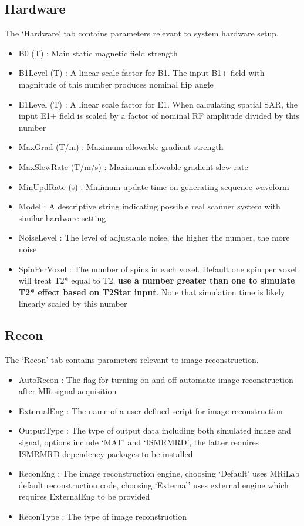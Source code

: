 \documentclass{book}%
\begin{document}
\subsection{Hardware}
The `Hardware' tab contains parameters relevant to system hardware setup.
	\begin{itemize}
		\item B0 (T) : Main static magnetic field strength
		\item B1Level (T) : A linear scale factor for B1. The input B1+ field with magnitude of this number produces nominal flip angle
		\item E1Level (T) : A linear scale factor for E1. When calculating spatial SAR, the input E1+ field is scaled by a factor of nominal RF amplitude divided by this number
		\item MaxGrad (T/m) : Maximum allowable gradient strength
	  \item MaxSlewRate (T/m/s) : Maximum allowable gradient slew rate
		\item MinUpdRate (s) : Minimum update time on generating sequence waveform
		\item Model : A descriptive string indicating possible real scanner system with similar hardware setting
		\item NoiseLevel :  The level of adjustable noise, the higher the number, the more noise
		\item SpinPerVoxel : The number of spins in each voxel. Default one spin per voxel will treat T2* equal to T2, \textbf{use a number greater than one to simulate T2* effect based on T2Star input}. Note that simulation time is likely linearly scaled by this number
	\end{itemize}

\subsection{Recon}
The `Recon' tab contains parameters relevant to image reconstruction.
	\begin{itemize}
		\item AutoRecon : The flag for turning on and off automatic image reconstruction after MR signal acquisition
		\item ExternalEng : The name of a user defined script for image reconstruction
		\item OutputType : The type of output data including both simulated image and signal, options include `MAT' and `ISMRMRD', the latter requires ISMRMRD dependency packages to be installed
	  \item ReconEng : The image reconstruction engine, choosing `Default' uses MRiLab default reconstruction code, choosing `External' uses external engine which requires ExternalEng to be provided
		\item ReconType :  The type of image reconstruction
	\end{itemize}
\end{document}
